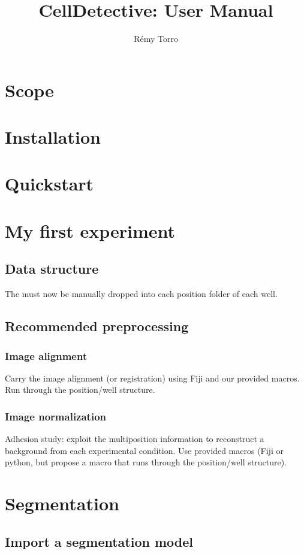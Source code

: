 \documentclass[10pt,a4paper]{article}
\title{CellDetective: User Manual}
\author{Rémy Torro}
\begin{document}
	\maketitle
	\section{Scope}
	\section{Installation}
	\section{Quickstart}
	\section{My first experiment}
	\subsection{Data structure}
	The must now be manually dropped into each position folder of each well.
	\subsection{Recommended preprocessing}
	\subsubsection{Image alignment}
	
	\par{}Carry the image alignment (or registration) using Fiji and our provided macros. Run through the position/well structure.
	
	
	\subsubsection{Image normalization}
	
	\par{Adhesion study: } exploit the multiposition information to reconstruct a background from each experimental condition. Use provided macros (Fiji or python, but propose a macro that runs through the position/well structure).
	
	\section{Segmentation}
	\subsection{Import a segmentation model}
\end{document}
